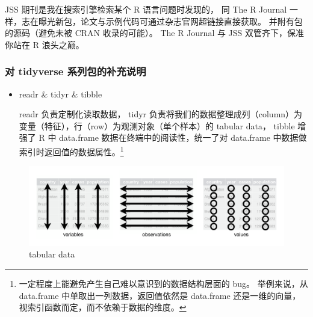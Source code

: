 \documentclass[11pt,hyperref]{ctexart}
\begin{document}
JSS 期刊是我在搜索引擎检索某个 R 语言问题时发现的， 同 The R Journal
一样，志在曝光新包，论文与示例代码可通过杂志官网超链接直接获取。
并附有包的源码（避免未被 CRAN 收录的可能）。 The R Journal 与 JSS
双管齐下，保准你站在 R 浪头之巅。

\hypertarget{ux5bf9-tidyverse-ux7cfbux5217ux5305ux7684ux8865ux5145ux8bf4ux660e}{%
\subsubsection{对 tidyverse
系列包的补充说明}\label{ux5bf9-tidyverse-ux7cfbux5217ux5305ux7684ux8865ux5145ux8bf4ux660e}}

\begin{itemize}
\item
  readr \& tidyr \& tibble

  readr 负责定制化读取数据， tidyr
  负责将我们的数据整理成列（column）为变量（特征），行（row）为观测对象（单个样本）的
  tabular data， tibble 增强了 R 中 data.frame
  数据在终端中的阅读性，统一了对 data.frame
  中数据做索引时返回值的数据属性。\footnote{一定程度上能避免产生自己难以意识到的数据结构层面的
    bug。 举例来说，从 data.frame 中单取出一列数据，返回值依然是
    data.frame 还是一维的向量，视索引函数而定，而不依赖于数据的维度。}
\end{itemize}

\begin{figure}
\centering
\includegraphics{images/tidy.png}
\caption{tabular data}
\end{figure}
\end{document}
